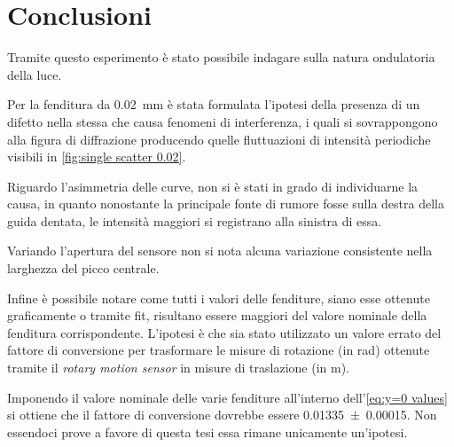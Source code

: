 \documentclass[../main.tex]{subfiles}
\begin{document}
\section{Conclusioni}

Tramite questo esperimento è stato possibile indagare sulla natura ondulatoria della luce.

Per la fenditura da \qty{0.02}{\mm} è stata formulata l'ipotesi della presenza di un difetto nella stessa che causa fenomeni di interferenza, i quali si sovrappongono alla figura di diffrazione producendo quelle fluttuazioni di intensità periodiche visibili in \autoref{fig:single scatter 0.02}.

Riguardo l'asimmetria delle curve, non si è stati in grado di individuarne la causa, in quanto nonostante la principale fonte di rumore fosse sulla destra della guida dentata, le intensità maggiori si registrano alla sinistra di essa. %

Variando l'apertura del sensore non si nota alcuna variazione consistente nella larghezza del picco centrale.

Infine è possibile notare come tutti i valori delle fenditure, siano esse ottenute graficamente o tramite fit, risultano essere maggiori del valore nominale della fenditura corrispondente. L'ipotesi è che sia stato utilizzato un valore errato %
del fattore di conversione per trasformare le misure di rotazione (in \si{\radian}) ottenute tramite il \textit{rotary motion sensor} in misure di traslazione (in \si{\m}).

Imponendo il valore nominale delle varie fenditure all'interno dell'\autoref{eq:y=0 values} si ottiene che %
il fattore di conversione dovrebbe essere \num{0.01335+-0.00015}. Non essendoci prove a favore di questa tesi essa rimane unicamente un'ipotesi.
\end{document}
